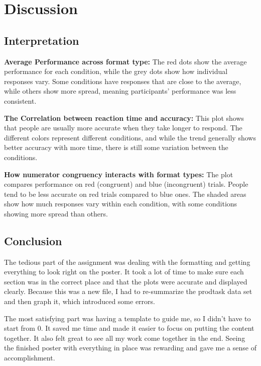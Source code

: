 \documentclass[
  man,floatsintext]{apa6}
\begin{document}
\newpage

\section{Discussion}\label{discussion}

\subsection{Interpretation}\label{interpretation}

\textbf{Average Performance across format type:} The red dots show the average performance for each condition, while the grey dots show how individual responses vary. Some conditions have responses that are close to the average, while others show more spread, meaning participants' performance was less consistent.

\textbf{The Correlation between reaction time and accuracy:} This plot shows that people are usually more accurate when they take longer to respond. The different colors represent different conditions, and while the trend generally shows better accuracy with more time, there is still some variation between the conditions.

\textbf{How numerator congruency interacts with format types:} The plot compares performance on red (congruent) and blue (incongruent) trials. People tend to be less accurate on red trials compared to blue ones. The shaded areas show how much responses vary within each condition, with some conditions showing more spread than others.

\newpage

\subsection{Conclusion}\label{conclusion}

The tedious part of the assignment was dealing with the formatting and getting everything to look right on the poster. It took a lot of time to make sure each section was in the correct place and that the plots were accurate and displayed clearly. Because this was a new file, I had to re-summarize the prodtask data set and then graph it, which introduced some errors.

The most satisfying part was having a template to guide me, so I didn't have to start from 0. It saved me time and made it easier to focus on putting the content together. It also felt great to see all my work come together in the end. Seeing the finished poster with everything in place was rewarding and gave me a sense of accomplishment.
\end{document}
